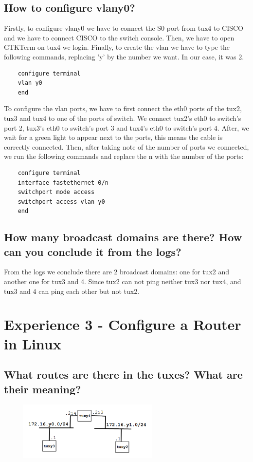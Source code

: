 \documentclass[11pt]{report}
\begin{document}
\subsection{How to configure vlany0?}
Firstly, to configure vlany0 we have to connect the S0 port from tux4 to CISCO and we have to connect CISCO to the switch console. Then, we have to open GTKTerm on tux4 we login. Finally, to create the vlan we have to type the following commands, replacing 'y' by the number we want. In our case, it was 2.

\begin{verbatim}
    configure terminal
    vlan y0
    end
\end{verbatim}

To configure the vlan ports, we have to first connect the eth0 ports of the tux2, tux3 and tux4 to one of the ports of switch. We connect tux2's eth0 to switch's port 2, tux3's eth0 to switch's port 3 and tux4's eth0 to switch's port 4. After, we wait for a green light to appear next to the ports, this means the cable is correctly connected. Then, after taking note of the number of ports we connected, we run the following commands and replace the n with the number of the ports:

\begin{verbatim}
    configure terminal
    interface fastethernet 0/n
    switchport mode access
    switchport access vlan y0
    end
\end{verbatim}

\subsection{How many broadcast domains are there? How can you conclude it from
the logs?}

From the logs we conclude there are 2 broadcast domains: one for tux2 and another one for tux3 and 4. Since tux2 can not ping neither tux3 nor tux4, and tux3 and 4 can ping each other but not tux2. 

\newpage

\section{Experience 3 - Configure a Router in Linux}

\subsection{What routes are there in the tuxes? What are their meaning?}
\begin{figure}[h!]
    \includegraphics[width=7cm]{images/exp3 rotas.png}
\end{figure}
    
\end{document}
